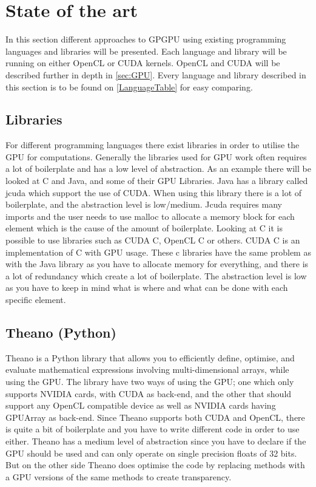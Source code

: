 \section{State of the art} %
\label{sec:state_of_the_art}
In this section different approaches to GPGPU using existing programming languages and libraries will be presented.
Each language and library will be running on either OpenCL or CUDA kernels.
OpenCL and CUDA will be described further in depth in \ref{sec:GPU}.
Every language and library described in this section is to be found on \ref{LanguageTable} for easy comparing.
      
\subsection{Libraries} 
For different programming languages there exist libraries in order to utilise the GPU for computations.
Generally the libraries used for GPU work often requires a lot of boilerplate and has a low level of abstraction.
As an example there will be looked at C and Java, and some of their GPU Libraries.
Java has a library called jcuda which support the use of CUDA.
When using this library there is a lot of boilerplate, and the abstraction level is low/medium\citep{Java_library}. 
Jcuda requires many imports and the user needs to use malloc to allocate a memory block for each element which is the cause of the amount of boilerplate.\citep{Java_malloc}
Looking at C it is possible to use libraries such as CUDA C, OpenCL C or others.
CUDA C is an implementation of C with GPU usage.
These c libraries have the same problem as with the Java library as you have to allocate memory for everything, and there is a lot of redundancy which create a lot of boilerplate.
The abstraction level is low as you have to keep in mind what is where and what can be done with each specific element.\citep{C_CUDA}
                                                  

\subsection{Theano (Python)}
Theano is a Python library that allows you to efficiently define, optimise, and evaluate mathematical expressions involving multi-dimensional arrays, while using the GPU.
The library have two ways of using the GPU; one which only supports NVIDIA cards, with CUDA as back-end, and the other that should support any OpenCL compatible device as well as NVIDIA cards having GPUArray as back-end.
Since Theano supports both CUDA and OpenCL, there is quite a bit of boilerplate and you have to write different code in order to use either.
Theano has a medium level of abstraction since you have to declare if the GPU should be used and can only operate on single precision floats of 32 bits.
But on the other side Theano does optimise the code by replacing methods with a GPU versions of the same methods to create transparency.\citep{Theano,Theano_GPU}

